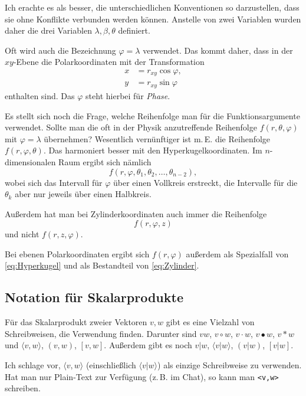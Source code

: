 \documentclass[a4paper,11pt,fleqn]{article}
\begin{document}
Ich erachte es als besser, die unterschiedlichen Konventionen so
darzustellen, dass sie ohne Konflikte verbunden werden können.
Anstelle von zwei Variablen wurden daher die drei Variablen
$\lambda,\beta,\theta$ definiert.

Oft wird auch die Bezeichnung $\varphi=\lambda$ verwendet.
Das kommt daher, dass in der $xy$-Ebene die Polarkoordinaten
mit der Transformation
\begin{equation}
  \begin{split}
  x &= r_{xy}\cos\varphi,\\
  y &= r_{xy}\sin\varphi
  \end{split}
\end{equation}
enthalten sind. Das $\varphi$ steht hierbei für \emph{Phase}.

Es stellt sich noch die Frage, welche Reihenfolge man für die
Funktionsargumente verwendet. Sollte man die oft in
der Physik anzutreffende Reihenfolge $f(r,\theta,\varphi)$
mit $\varphi=\lambda$ übernehmen? Wesentlich vernünftiger ist m.\,E.
die Reihenfolge $f(r,\varphi,\theta)$. Das harmoniert besser mit
den Hyperkugelkoordinaten. Im $n$-dimensionalen Raum ergibt sich
nämlich
\begin{equation}\label{eq:Hyperkugel}
f(r,\varphi,\theta_1,\theta_2,\ldots,\theta_{n-2}),
\end{equation}
wobei sich das Intervall für $\varphi$ über einen Vollkreis
erstreckt, die Intervalle für die $\theta_k$ aber nur jeweils
über einen Halbkreis.

Außerdem hat man bei Zylinderkoordinaten auch immer die
Reihenfolge%
\begin{equation}\label{eq:Zylinder}
f(r,\varphi,z)
\end{equation}
und nicht $f(r,z,\varphi)$.

Bei ebenen Polarkoordinaten ergibt sich $f(r,\varphi)$
außerdem als Spezialfall von \eqref{eq:Hyperkugel}
und als Bestandteil von \eqref{eq:Zylinder}.


\subsection{Notation für Skalarprodukte}
Für das Skalarprodukt zweier Vektoren $v,w$ gibt es eine Vielzahl von
Schreibweisen, die Verwendung finden. Darunter sind $vw$, $v\circ w$,
$v\cdot w$, $v\bullet w$, $v*w$ und $\langle v,w\rangle$,
$(v,w)$, $[v,w]$. Außerdem gibt es noch $v|w$, $\langle v|w\rangle$,
$(v|w)$, $[v|w]$.

Ich schlage vor, $\langle v,w\rangle$ (einschließlich
$\langle v|w\rangle$) als einzige Schreibweise zu verwenden.
Hat man nur Plain-Text zur Verfügung (z.\,B. im Chat), so
kann man \verb|<v,w>| schreiben.
\end{document}
